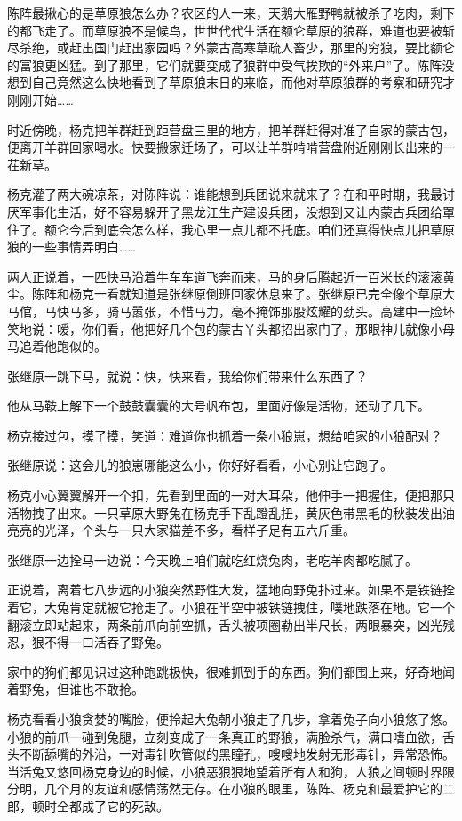 \par 陈阵最揪心的是草原狼怎么办？农区的人一来，天鹅大雁野鸭就被杀了吃肉，剩下的都飞走了。而草原狼不是候鸟，世世代代生活在额仑草原的狼群，难道也要被斩尽杀绝，或赶出国门赶出家园吗？外蒙古高寒草疏人畜少，那里的穷狼，要比额仑的富狼更凶猛。到了那里，它们就要变成了狼群中受气挨欺的“外来户”了。陈阵没想到自己竟然这么快地看到了草原狼末日的来临，而他对草原狼群的考察和研究才刚刚开始……
\par 时近傍晚，杨克把羊群赶到距营盘三里的地方，把羊群赶得对准了自家的蒙古包，便离开羊群回家喝水。快要搬家迁场了，可以让羊群啃啃营盘附近刚刚长出来的一茬新草。
\par 杨克灌了两大碗凉茶，对陈阵说：谁能想到兵团说来就来了？在和平时期，我最讨厌军事化生活，好不容易躲开了黑龙江生产建设兵团，没想到又让内蒙古兵团给罩住了。额仑今后到底会怎么样，我心里一点儿都不托底。咱们还真得快点儿把草原狼的一些事情弄明白……
\par 两人正说着，一匹快马沿着牛车车道飞奔而来，马的身后腾起近一百米长的滚滚黄尘。陈阵和杨克一看就知道是张继原倒班回家休息来了。张继原已完全像个草原大马倌，马快马多，骑马嚣张，不惜马力，毫不掩饰那股炫耀的劲头。高建中一脸坏笑地说：嗳，你们看，他把好几个包的蒙古丫头都招出家门了，那眼神儿就像小母马追着他跑似的。
\par 张继原一跳下马，就说：快，快来看，我给你们带来什么东西了？
\par 他从马鞍上解下一个鼓鼓囊囊的大号帆布包，里面好像是活物，还动了几下。
\par 杨克接过包，摸了摸，笑道：难道你也抓着一条小狼崽，想给咱家的小狼配对？
\par 张继原说：这会儿的狼崽哪能这么小，你好好看看，小心别让它跑了。
\par 杨克小心翼翼解开一个扣，先看到里面的一对大耳朵，他伸手一把握住，便把那只活物拽了出来。一只草原大野兔在杨克手下乱蹬乱扭，黄灰色带黑毛的秋装发出油亮亮的光泽，个头与一只大家猫差不多，看样子足有五六斤重。
\par 张继原一边拴马一边说：今天晚上咱们就吃红烧兔肉，老吃羊肉都吃腻了。
\par 正说着，离着七八步远的小狼突然野性大发，猛地向野兔扑过来。如果不是铁链拴着它，大兔肯定就被它抢走了。小狼在半空中被铁链拽住，噗地跌落在地。它一个翻滚立即站起来，两条前爪向前空抓，舌头被项圈勒出半尺长，两眼暴突，凶光残忍，狠不得一口活吞了野兔。
\par 家中的狗们都见识过这种跑跳极快，很难抓到手的东西。狗们都围上来，好奇地闻着野兔，但谁也不敢抢。
\par 杨克看看小狼贪婪的嘴脸，便拎起大兔朝小狼走了几步，拿着兔子向小狼悠了悠。小狼的前爪一碰到兔腿，立刻变成了一条真正的野狼，满脸杀气，满口嗜血欲，舌头不断舔嘴的外沿，一对毒针吹管似的黑瞳孔，嗖嗖地发射无形毒针，异常恐怖。当活兔又悠回杨克身边的时候，小狼恶狠狠地望着所有人和狗，人狼之间顿时界限分明，几个月的友谊和感情荡然无存。在小狼的眼里，陈阵、杨克和最爱护它的二郎，顿时全都成了它的死敌。
